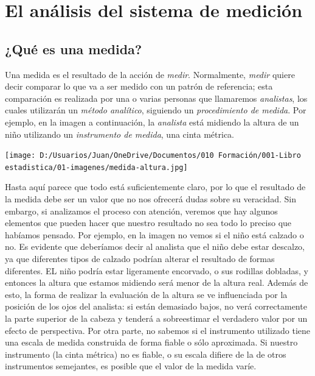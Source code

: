 \documentclass[
  letterpaper,
  DIV=11,
  numbers=noendperiod,
  oneside]{scrreprt}
\begin{document}
\hypertarget{el-anuxe1lisis-del-sistema-de-mediciuxf3n}{%
\chapter{El análisis del sistema de
medición}\label{el-anuxe1lisis-del-sistema-de-mediciuxf3n}}

\hypertarget{quuxe9-es-una-medida}{%
\section{¿Qué es una medida?}\label{quuxe9-es-una-medida}}

Una medida es el resultado de la acción de \emph{medir}. Normalmente,
\emph{medir} quiere decir comparar lo que va a ser medido con un patrón
de referencia; esta comparación es realizada por una o varias personas
que llamaremos \emph{analistas}, los cuales utilizarán un \emph{método
analítico}, siguiendo un \emph{procedimiento de medida}. Por ejemplo, en
la imagen a continuación, la \emph{analista} está midiendo la altura de
un niño utilizando un \emph{instrumento de medida}, una cinta métrica.

\begin{marginfigure}

{\centering \texttt{[image: D:/Usuarios/Juan/OneDrive/Documentos/010 Formación/001-Libro estadistica/01-imagenes/medida-altura.jpg]}

}

\end{marginfigure}

Hasta aquí parece que todo está suficientemente claro, por lo que el
resultado de la medida debe ser un valor que no nos ofrecerá dudas sobre
su veracidad. Sin embargo, si analizamos el proceso con atención,
veremos que hay algunos elementos que pueden hacer que nuestro resultado
no sea todo lo preciso que habíamos pensado. Por ejemplo, en la imagen
no vemos si el niño está calzado o no. Es evidente que deberíamos decir
al analista que el niño debe estar descalzo, ya que diferentes tipos de
calzado podrían alterar el resultado de formas diferentes. EL niño
podría estar ligeramente encorvado, o sus rodillas dobladas, y entonces
la altura que estamos midiendo será menor de la altura real. Además de
esto, la forma de realizar la evaluación de la altura se ve influenciada
por la posición de los ojos del analista: si están demasiado bajos, no
verá correctamente la parte superior de la cabeza y tenderá a
sobreestimar el verdadero valor por un efecto de perspectiva. Por otra
parte, no sabemos si el instrumento utilizado tiene una escala de medida
construida de forma fiable o sólo aproximada. Si nuestro instrumento (la
cinta métrica) no es fiable, o su escala difiere de la de otros
instrumentos semejantes, es posible que el valor de la medida varíe.
\end{document}
